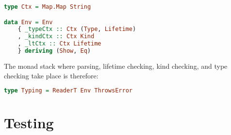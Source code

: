 \begin{lstlisting}[caption=Record data type showing contexts., language=Haskell, label={lst:contexts}]
type Ctx = Map.Map String

data Env = Env
    { _typeCtx :: Ctx (Type, Lifetime)
    , _kindCtx :: Ctx Kind
    , _ltCtx :: Ctx Lifetime
    } deriving (Show, Eq)
\end{lstlisting}

The monad stack where parsing, lifetime checking, kind checking, and type
checking take place is therefore:

\begin{lstlisting}[caption=Envirnment and error monad stack., language=Haskell, label={lst:monads}]
type Typing = ReaderT Env ThrowsError
\end{lstlisting}

\section{Testing}

